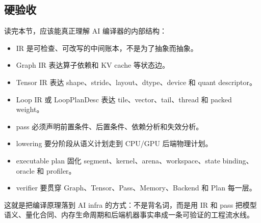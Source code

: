 \subsection{硬验收}

读完本节，应该能真正理解 AI 编译器的内部结构：

\begin{itemize}
  \item IR 是可检查、可改写的中间账本，不是为了抽象而抽象。
  \item Graph IR 表达算子依赖和 KV cache 等状态边。
  \item Tensor IR 表达 shape、stride、layout、dtype、device 和 quant descriptor。
  \item Loop IR 或 LoopPlanDesc 表达 tile、vector、tail、thread 和 packed weight。
  \item pass 必须声明前置条件、后置条件、依赖分析和失效分析。
  \item lowering 要分阶段从语义计划走到 CPU/GPU 后端物理计划。
  \item executable plan 固化 segment、kernel、arena、workspace、state binding、oracle 和 profiler。
  \item verifier 要贯穿 Graph、Tensor、Pass、Memory、Backend 和 Plan 每一层。
\end{itemize}

这就是把编译原理落到 AI infra 的方式：不是背名词，而是用 IR 和 pass 把模型语义、量化合同、内存生命周期和后端机器事实串成一条可验证的工程流水线。
